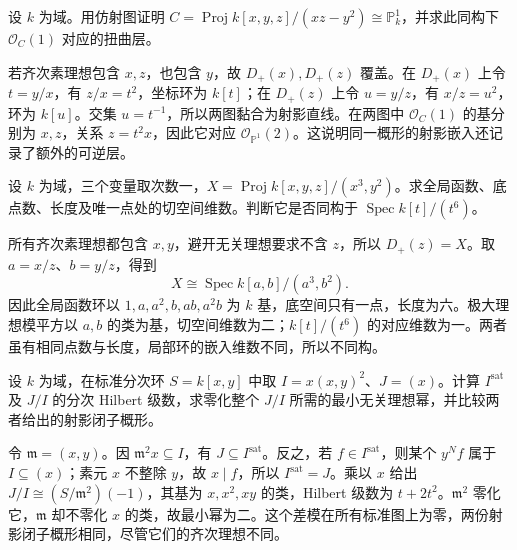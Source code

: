 \begin{optionalexercise}\label{b3:ex:24-conic-is-projective-line}
	设 \(k\) 为域。用仿射图证明 \(C=\operatorname{Proj}k[x,y,z]/(xz-y^2)\cong\mathbb P_k^1\)，并求此同构下 \(\mathcal O_C(1)\) 对应的扭曲层。
\end{optionalexercise}
\begin{solution}
	若齐次素理想包含 \(x,z\)，也包含 \(y\)，故 \(D_+(x),D_+(z)\) 覆盖。在 \(D_+(x)\) 上令 \(t=y/x\)，有 \(z/x=t^2\)，坐标环为 \(k[t]\)；在 \(D_+(z)\) 上令 \(u=y/z\)，有 \(x/z=u^2\)，环为 \(k[u]\)。交集 \(u=t^{-1}\)，所以两图黏合为射影直线。在两图中 \(\mathcal O_C(1)\) 的基分别为 \(x,z\)，关系 \(z=t^2x\)，因此它对应 \(\mathcal O_{\mathbb P^1}(2)\)。这说明同一概形的射影嵌入还记录了额外的可逆层。
\end{solution}

\begin{optionalexercise}\label{b3:ex:24-fat-projective-point}
	设 \(k\) 为域，三个变量取次数一，\(X=\operatorname{Proj}k[x,y,z]/(x^3,y^2)\)。求全局函数、底点数、长度及唯一点处的切空间维数。判断它是否同构于 \(\operatorname{Spec}k[t]/(t^6)\)。
\end{optionalexercise}
\begin{solution}
	所有齐次素理想都包含 \(x,y\)，避开无关理想要求不含 \(z\)，所以 \(D_+(z)=X\)。取 \(a=x/z\)、\(b=y/z\)，得到
	\[
		X\cong\operatorname{Spec}k[a,b]/(a^3,b^2).
	\]
	因此全局函数环以 \(1,a,a^2,b,ab,a^2b\) 为 \(k\) 基，底空间只有一点，长度为六。极大理想模平方以 \(a,b\) 的类为基，切空间维数为二；\(k[t]/(t^6)\) 的对应维数为一。两者虽有相同点数与长度，局部环的嵌入维数不同，所以不同构。
\end{solution}

\begin{optionalexercise}\label{b3:ex:24-proj-forgets-torsion}
	设 \(k\) 为域，在标准分次环 \(S=k[x,y]\) 中取 \(I=x(x,y)^2\)、\(J=(x)\)。计算 \(I^{\mathrm{sat}}\) 及 \(J/I\) 的分次 Hilbert 级数，求零化整个 \(J/I\) 所需的最小无关理想幂，并比较两者给出的射影闭子概形。
\end{optionalexercise}
\begin{solution}
	令 \(\mathfrak m=(x,y)\)。因 \(\mathfrak m^2x\subseteq I\)，有 \(J\subseteq I^{\mathrm{sat}}\)。反之，若 \(f\in I^{\mathrm{sat}}\)，则某个 \(y^Nf\) 属于 \(I\subseteq(x)\)；素元 \(x\) 不整除 \(y\)，故 \(x\mid f\)，所以 \(I^{\mathrm{sat}}=J\)。乘以 \(x\) 给出 \(J/I\cong(S/\mathfrak m^2)(-1)\)，其基为 \(x,x^2,xy\) 的类，Hilbert 级数为 \(t+2t^2\)。\(\mathfrak m^2\) 零化它，\(\mathfrak m\) 却不零化 \(x\) 的类，故最小幂为二。这个差模在所有标准图上为零，两份射影闭子概形相同，尽管它们的齐次理想不同。
\end{solution}

